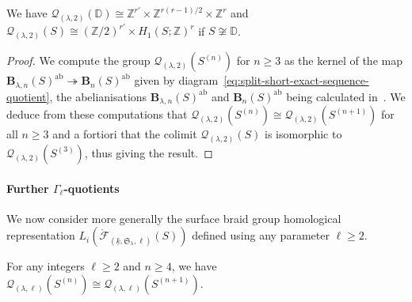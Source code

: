 \documentclass[AHL,Unicode,published]{cedram}
\newcommand{\ab}{\mathrm{ab}}
\newcommand{\Int}{\mathring}
\newcommand{\B}{\ensuremath{\mathbf{B}}}
\newcommand{\LCS}{\varGamma}
\newcommand{\Sym}{\mathfrak{S}}
\newcommand{\cF}{\mathcal{F}}
\newcommand{\cQ}{\mathcal{Q}}
\newcommand{\bD}{\mathbb{D}}
\newcommand{\bZ}{\mathbb{Z}}
\renewcommand{\geq}{\geqslant}
\begin{document}
\begin{lemm}\label{lem:transformation_groups_ab_quotient_surface_braid_groups}
We have $\cQ_{(\lambda,2)}(\bD) \cong \bZ^{r'} \times \bZ^{r(r-1)/2} \times \bZ^{r}$ and $\cQ_{(\lambda,2)}(S) \cong (\bZ/2)^{r'} \times H_{1}(S;\bZ)^{r}$ if $S \not\cong \bD$.
\end{lemm}

\begin{proof}
We compute the group $\cQ_{(\lambda,2)}(S^{(n)})$ for $n\geq 3$ as the kernel of the map $\B_{\lambda,n}(S)^{\ab}\twoheadrightarrow\B_{n}(S)^{\ab}$ given by diagram~\eqref{eq:split-short-exact-sequence-quotient}, the abelianisations $\B_{\lambda,n}(S)^{\ab}$ and $\B_{n}(S)^{\ab}$ being calculated in~\cite[Props.~3.5 and~6.47]{DPS}. We deduce from these computations that $\cQ_{(\lambda,2)}(S^{(n)}) \cong \cQ_{(\lambda,2)}(S^{(n+1)})$ for all $n\geq 3$ and a fortiori that the colimit $\cQ_{(\lambda,2)}(S)$ is isomorphic to $\cQ_{(\lambda,2)}(S^{(3)})$, thus giving the result.
\end{proof}


\paragraph*{Further $\LCS_{\ell}$-quotients}
We now consider more generally the surface braid group homological representation $L_{i}(\Int{\cF}_{(\underline{k},\Sym_{\lambda},\ell)}(S))$ defined using any parameter $\ell\geq 2$.

\begin{prop}\label{prop:Q-stab-general}
For any integers $\ell\geq 2$ and $n\geq 4$, we have $\cQ_{(\lambda,\ell)}(S^{(n)})\cong\cQ_{(\lambda,\ell)}(S^{(n+1)})$.
\end{prop}
\end{document}
